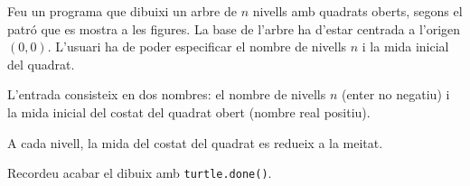 

\Statement

Feu un programa que dibuixi un arbre de $n$ nivells amb quadrats oberts, segons
el patró que es mostra a les figures. La base de l'arbre ha d'estar centrada a l'origen $(0,0)$.
L'usuari ha de poder especificar el nombre de nivells $n$ i la mida inicial del quadrat.

\medskip

L'entrada consisteix en dos nombres: el nombre de nivells $n$ (enter no negatiu) i
la mida inicial del costat del quadrat obert (nombre real positiu).

\medskip

A cada nivell, la mida del costat del quadrat es redueix a la meitat.

\medskip

Recordeu acabar el dibuix amb \texttt{turtle.done()}.

\Sample
